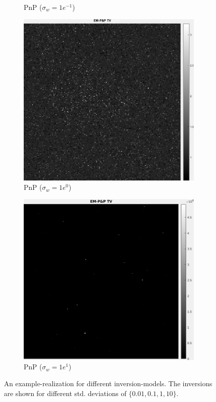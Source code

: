 \documentclass[a4paper, 11pt]{article}
\begin{document}
\begin{figure}[h]
\begin{subfigure}[b]{0.22\textwidth}
        \caption{PnP ($\sigma_w=1e^{-1}$)}
        \label{fig:PnP-1}
    \end{subfigure}
    \begin{subfigure}[b]{0.22\textwidth}
        \includegraphics[width=\textwidth]{../Figures/PnPReconstructionNoiseSigma1e0.png}
        \caption{PnP ($\sigma_w=1e^{0}$)}
        \label{fig:PnP0}
    \end{subfigure}
    \begin{subfigure}[b]{0.22\textwidth}
        \includegraphics[width=\textwidth]{../Figures/PnPReconstructionNoiseSigma1e1.png}
        \caption{PnP ($\sigma_w=1e^{1}$)}
        \label{fig:PnP1}
    \end{subfigure}
\caption{An example-realization for different inversion-models. The inversions are shown for different std. deviations of $\{0.01,0.1, 1,10\}$.}
\label{fig:inversionModel}
\end{figure}
\end{document}
